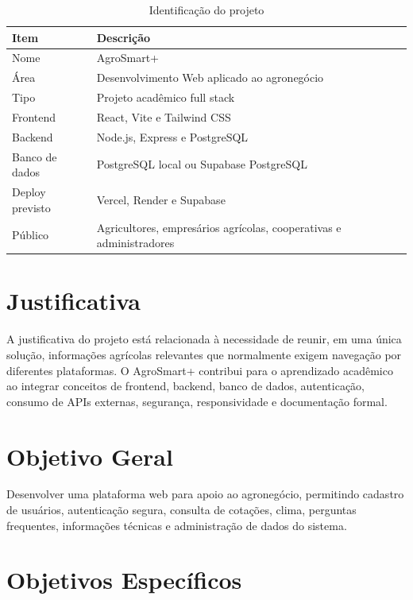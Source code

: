 \documentclass[
  12pt,
  oneside,
  a4paper,
  brazil
]{abntex2}
\begin{document}
\begin{table}[h]
\centering
\caption{Identificação do projeto}
\begin{tabularx}{\textwidth}{@{}lY@{}}
\toprule
\textbf{Item} & \textbf{Descrição} \\
\midrule
Nome & AgroSmart+ \\
Área & Desenvolvimento Web aplicado ao agronegócio \\
Tipo & Projeto acadêmico full stack \\
Frontend & React, Vite e Tailwind CSS \\
Backend & Node.js, Express e PostgreSQL \\
Banco de dados & PostgreSQL local ou Supabase PostgreSQL \\
Deploy previsto & Vercel, Render e Supabase \\
Público & Agricultores, empresários agrícolas, cooperativas e administradores \\
\bottomrule
\end{tabularx}
\end{table}

\section{Justificativa}

A justificativa do projeto está relacionada à necessidade de reunir, em uma única solução, informações agrícolas relevantes que normalmente exigem navegação por diferentes plataformas. O AgroSmart+ contribui para o aprendizado acadêmico ao integrar conceitos de frontend, backend, banco de dados, autenticação, consumo de APIs externas, segurança, responsividade e documentação formal.

\section{Objetivo Geral}

Desenvolver uma plataforma web para apoio ao agronegócio, permitindo cadastro de usuários, autenticação segura, consulta de cotações, clima, perguntas frequentes, informações técnicas e administração de dados do sistema.

\section{Objetivos Específicos}
\end{document}
